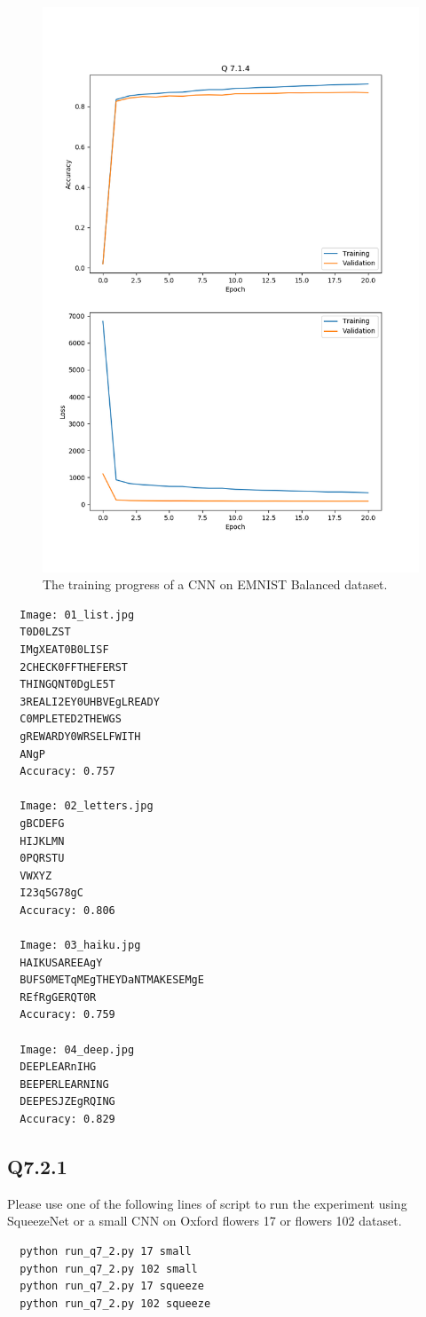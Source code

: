 \documentclass[11pt]{article}
\begin{document}
\begin{figure}[h!]
    \centering
    \includegraphics[width=.6\linewidth]{../results/q7_1_4.png}
    \caption{The training progress of a CNN on EMNIST Balanced dataset. }
    \label{fig:q7.1.4}
\end{figure}

\begin{verbatim}
  Image: 01_list.jpg
  T0D0LZST
  IMgXEAT0B0LISF
  2CHECK0FFTHEFERST
  THINGQNT0DgLE5T
  3REALI2EY0UHBVEgLREADY
  C0MPLETED2THEWGS
  gREWARDY0WRSELFWITH
  ANgP
  Accuracy: 0.757

  Image: 02_letters.jpg
  gBCDEFG
  HIJKLMN
  0PQRSTU
  VWXYZ
  I23q5G78gC
  Accuracy: 0.806

  Image: 03_haiku.jpg
  HAIKUSAREEAgY
  BUFS0METqMEgTHEYDaNTMAKESEMgE
  REfRgGERQT0R
  Accuracy: 0.759

  Image: 04_deep.jpg
  DEEPLEARnIHG
  BEEPERLEARNING
  DEEPESJZEgRQING
  Accuracy: 0.829
\end{verbatim}

\newpage
\subsection*{Q7.2.1}

Please use one of the following lines of script to run the experiment using SqueezeNet or a small CNN on Oxford flowers 17 or flowers 102 dataset.

\begin{verbatim}
  python run_q7_2.py 17 small
  python run_q7_2.py 102 small
  python run_q7_2.py 17 squeeze
  python run_q7_2.py 102 squeeze
\end{verbatim}
\end{document}

